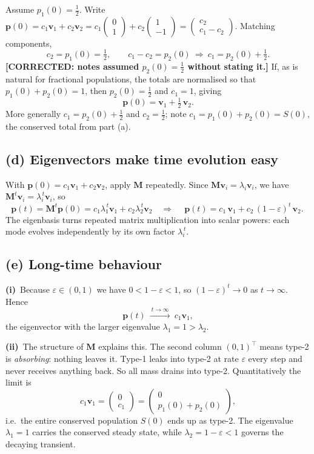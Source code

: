 \documentclass[12pt,a4paper]{article}
\newcommand{\fix}[1]{{\textbf{\textcolor{orange!85!black}{[CORRECTED: #1]}}}}
\theoremstyle{definition}
\newcommand{\Mx}{\mathbf{M}}
\newcommand{\vv}{\mathbf{v}}
\newcommand{\pp}{\mathbf{p}}
\newcommand{\T}{^{\!\top}}
\begin{document}
Assume $p_1(0)=\tfrac12$. Write
$\pp(0)=c_1\vv_1+c_2\vv_2=c_1\!\begin{pmatrix}0\\1\end{pmatrix}+c_2\!\begin{pmatrix}1\\-1\end{pmatrix}
=\begin{pmatrix}c_2\\ c_1-c_2\end{pmatrix}.$
Matching components,
\[
c_2=p_1(0)=\tfrac12,\qquad c_1-c_2=p_2(0)\ \Rightarrow\ c_1=p_2(0)+\tfrac12 .
\]
\fix{notes assumed $p_2(0)=\tfrac12$ without stating it.} If, as is natural for
fractional populations, the totals are normalised so that
$p_1(0)+p_2(0)=1$, then $p_2(0)=\tfrac12$ and $c_1=1$, giving
\[
\boxed{\ \pp(0)=\vv_1+\tfrac12\,\vv_2.\ }
\]
More generally $c_1=p_2(0)+\tfrac12$ and $c_2=\tfrac12$; note
$c_1=p_1(0)+p_2(0)=S(0)$, the conserved total from part (a).

\subsection{(d) Eigenvectors make time evolution easy}

With $\pp(0)=c_1\vv_1+c_2\vv_2$, apply $\Mx$ repeatedly. Since
$\Mx\vv_i=\lambda_i\vv_i$, we have $\Mx^{t}\vv_i=\lambda_i^{\,t}\vv_i$, so
\[
\pp(t)=\Mx^{t}\pp(0)=c_1\lambda_1^{\,t}\vv_1+c_2\lambda_2^{\,t}\vv_2
\quad\Longrightarrow\quad
\boxed{\ \pp(t)=c_1\,\vv_1+c_2\,(1-\varepsilon)^{t}\,\vv_2.\ }
\]
The eigenbasis turns repeated matrix multiplication into scalar powers: each
mode evolves independently by its own factor $\lambda_i^{\,t}$.

\subsection{(e) Long-time behaviour}

\textbf{(i)}~Because $\varepsilon\in(0,1)$ we have $0<1-\varepsilon<1$, so
$(1-\varepsilon)^{t}\to0$ as $t\to\infty$. Hence
\[
\pp(t)\ \xrightarrow{\ t\to\infty\ }\ c_1\vv_1,
\]
the eigenvector with the larger eigenvalue $\lambda_1=1>\lambda_2$.

\textbf{(ii)}~The structure of $\Mx$ explains this. The second column
$(0,1)\T$ means type-2 is \emph{absorbing}: nothing leaves it. Type-1 leaks
into type-2 at rate $\varepsilon$ every step and never receives anything back.
So all mass drains into type-2. Quantitatively the limit is
\[
c_1\vv_1=\begin{pmatrix}0\\ c_1\end{pmatrix}
=\begin{pmatrix}0\\ p_1(0)+p_2(0)\end{pmatrix},
\]
i.e.\ the entire conserved population $S(0)$ ends up as type-2. The eigenvalue
$\lambda_1=1$ carries the conserved steady state, while $\lambda_2=1-\varepsilon<1$
governs the decaying transient.
\end{document}
